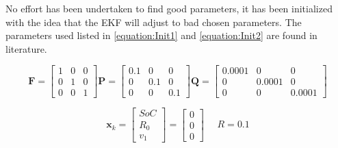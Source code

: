 No effort has been undertaken to find good parameters, it has been initialized with the idea that the EKF will adjust to bad chosen parameters. The parameters used listed in \ref{equation:Init1} and \ref{equation:Init2} are found in literature. %

\begin{equation}
 \boldsymbol F= 
 \begin{bmatrix}
 1 & 0 & 0\\
 0 & 1 & 0\\
 0 & 0 & 1
 \end{bmatrix} 
 \boldsymbol P= 
 \begin{bmatrix}
 0.1 & 0 & 0\\
 0 & 0.1 & 0\\
 0 & 0 & 0.1
 \end{bmatrix}
  \boldsymbol Q= 
  \begin{bmatrix}
  0.0001 & 0 & 0\\
  0 & 0.0001 & 0\\
  0 & 0 & 0.0001
  \end{bmatrix}
\label{equation:Init1} 
\end{equation} 

\begin{equation}
 \boldsymbol x_k = 
\begin{bmatrix}
SoC \\
R_0 \\
v_1
\end{bmatrix} = 
\begin{bmatrix}
0\\
0 \\
0
\end{bmatrix}  
\ \ \ \ \ \ R = 0.1
\label{equation:Init2}
\end{equation}



